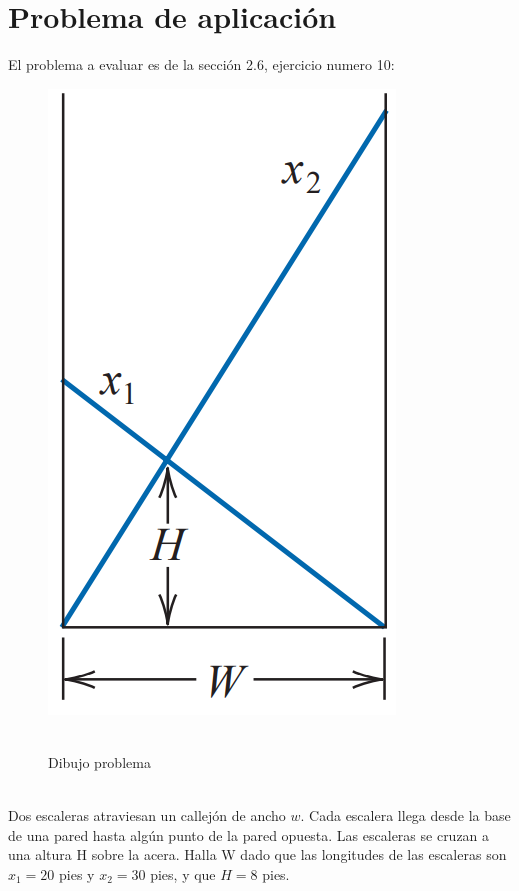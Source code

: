 \documentclass[ceqn,10pt]{SelfArx}
\begin{document}
\section{Problema de aplicación}
El problema a evaluar es de la sección 2.6, ejercicio numero
10\cite{burden2017}:
\begin{figure}[ht]\centering
	\includegraphics[scale=0.4]{problema.png}\\\
	\caption{Dibujo problema}
	\label{fig:problema}
\end{figure}
\\Dos escaleras atraviesan un callejón de ancho $w$. Cada escalera llega
desde la base de una pared hasta algún punto de la pared opuesta. Las
escaleras se cruzan a una altura H sobre la acera. Halla W dado que las
longitudes de las escaleras son $x_{1} = 20$ pies y $x_{2} = 30$ pies, y
que $H = 8$ pies.\\
\end{document}
